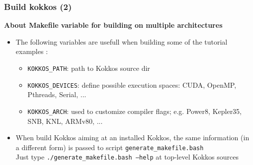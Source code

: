 \begin{frame}
  \frametitle{Build kokkos (2)}

  \textbf{About Makefile variable for building on multiple architectures}

  \begin{itemize}
  \item The following variables are usefull when building some of the tutorial examples :
    \begin{itemize}
    \item \texttt{KOKKOS\_PATH}: path to Kokkos source dir
    \item \texttt{KOKKOS\_DEVICES}: define possible execution spaces: CUDA, OpenMP, Pthreads, Serial, ...
    \item \texttt{KOKKOS\_ARCH}: used to customize compiler flags; e.g. Power8, Kepler35, SNB, KNL, ARMv80, ...
    \end{itemize}
  \item When build Kokkos aiming at an installed Kokkos, the same information (in a different form) is passed to script \texttt{generate\_makefile.bash}\\
    Just type \texttt{./generate\_makefile.bash --help} at top-level Kokkos sources
  \end{itemize}
  
\end{frame}
  
